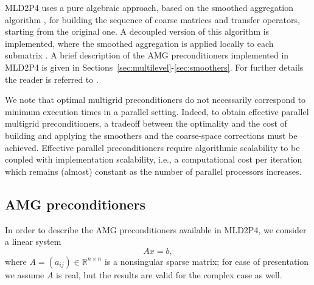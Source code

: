MLD2P4 uses a pure algebraic approach, based on the smoothed 
aggregation algorithm \cite{BREZINA_VANEK,VANEK_MANDEL_BREZINA},
for building the sequence of coarse matrices and transfer operators,
starting from the original one.
A decoupled version of this algorithm is implemented, where the smoothed
aggregation is applied locally to each submatrix \cite{TUMINARO_TONG}.
A brief description of the AMG preconditioners implemented in MLD2P4 is given in 
Sections~\ref{sec:multilevel}-\ref{sec:smoothers}. For further details the reader
is referred to \cite{para_04,aaecc_07,apnum_07,MLD2P4_TOMS}.

We note that optimal multigrid preconditioners do not necessarily correspond
to minimum execution times in a parallel setting. Indeed, to obtain effective parallel
multigrid preconditioners, a tradeoff between the optimality and the cost of building and
applying the smoothers and the coarse-space corrections must be achieved. Effective
parallel preconditioners require algorithmic scalability to be coupled with implementation
scalability, i.e., a computational cost per iteration which remains (almost) constant as
the number of parallel processors increases.


\subsection{AMG preconditioners\label{sec:multilevel}}

In order to describe the AMG preconditioners available in MLD2P4, we consider a
linear system
\begin{equation}
Ax=b, \label{eq:system}
\end{equation}
where $A=(a_{ij}) \in \mathbb{R}^{n \times n}$ is a nonsingular sparse matrix;
for ease of presentation we assume $A$ is real, but the
results are valid for the complex case as well. 

